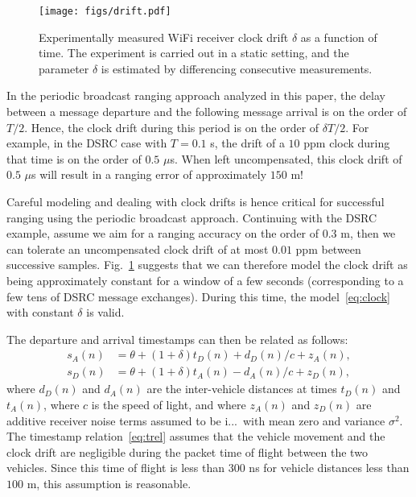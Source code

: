 \documentclass[12pt,journal,final,onecolumn]{IEEEtran}
\makeatletter
\newcommand{\iid}{i.\@i.\@d.\ }
\theoremstyle{definition}
\theoremstyle{myremark}
\makeatother
\begin{document}
\begin{figure}[htbp]
    \centering 
    \texttt{[image: figs/drift.pdf]} 

    \caption{Experimentally measured WiFi receiver clock drift $\delta$ as a
    function of time. The experiment is carried out in a static setting, and the
    parameter $\delta$ is estimated by differencing consecutive measurements.}

    \label{fig:drift}
\end{figure}

In the periodic broadcast ranging approach analyzed in this paper, the delay
between a message departure and the following message arrival is on the order of
$T/2$. Hence, the clock drift during this period is on the order of $\delta
T/2$.  For example, in the DSRC case with $T = 0.1$ s, the drift of a $10$ ppm
clock during that time is on the order of $0.5$ $\mu$s. When left uncompensated,
this clock drift of $0.5$ $\mu$s will result in a ranging error of approximately
$150$ m! 

Careful modeling and dealing with clock drifts is hence critical for successful
ranging using the periodic broadcast approach. Continuing with the DSRC example,
assume we aim for a ranging accuracy on the order of $0.3$ m, then we can
tolerate an uncompensated clock drift of at most $0.01$ ppm between successive
samples.  Fig.~\ref{fig:drift} suggests that we can therefore model the clock
drift as being approximately constant for a window of a few seconds
(corresponding to a few tens of DSRC message exchanges). During this time, the
model~\eqref{eq:clock} with constant $\delta$ is valid. 

The departure and arrival timestamps can then be related as follows:
\begin{subequations}
    \label{eq:trel}
    \begin{align}
        s_A(n) & = \theta+(1+\delta)t_D(n)+d_D(n)/c+z_A(n), \\
        s_D(n) & = \theta+(1+\delta)t_A(n)-d_A(n)/c+z_D(n), 
    \end{align}
\end{subequations}
where $d_D(n)$ and $d_A(n)$ are the inter-vehicle distances at times $t_D(n)$ and
$t_A(n)$, where $c$ is the speed of light, and where $z_A(n)$ and $z_D(n)$ are
additive receiver noise terms assumed to be \iid with mean zero and variance
$\sigma^2$. The timestamp relation~\eqref{eq:trel} assumes
that the vehicle movement and the clock drift are negligible during the packet time of
flight between the two vehicles. Since this time of flight is less than $300$ ns
for vehicle distances less than $100$ m, this assumption is reasonable.
\end{document}
